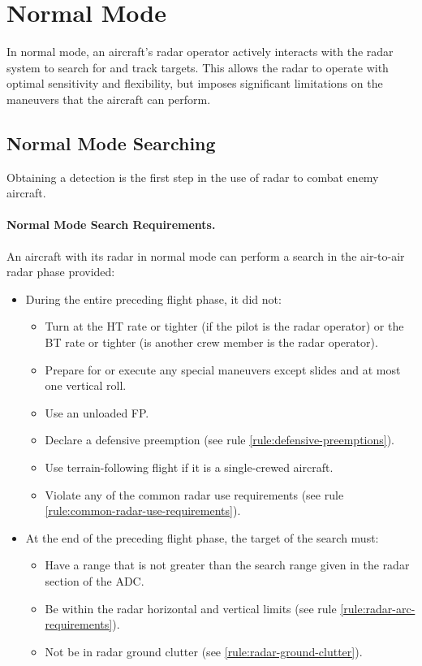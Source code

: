 {\section{Normal Mode}
\label{rule:normal-mode}

In normal mode, an aircraft's radar operator actively interacts with the radar system to search for and track targets. This allows the radar to operate with optimal sensitivity and flexibility, but imposes significant limitations on the maneuvers that the aircraft can perform.

\subsection{Normal Mode Searching}
\label{rule:normal-mode-searching}

Obtaining a detection is the first step in the use of radar to combat enemy aircraft.

\paragraph{Normal Mode Search Requirements.}
\label{rule:radar-search-requirements}

An aircraft with its radar in normal mode can perform a search in the air-to-air radar phase provided:

\begin{itemize}

\item During the entire preceding flight phase, it did not:
\begin{itemize}
        \item Turn at the HT rate or tighter (if the pilot is the radar operator) or the BT rate or tighter (is another crew member is the radar operator).
        \item Prepare for or execute any special maneuvers except slides and at most one vertical roll.
        \item Use an unloaded FP.
        \item Declare a defensive preemption (see rule \ref{rule:defensive-preemptions}).
        \item Use terrain-following flight if it is a single-crewed aircraft.
        \item Violate any of the common radar use requirements (see rule \ref{rule:common-radar-use-requirements}).
\end{itemize}

\item At the end of the preceding flight phase, the target of the search must:
\begin{itemize}
    \item Have a range that is not greater than the search range given in the radar section of the ADC. 
    \item Be within the radar horizontal and vertical limits (see rule \ref{rule:radar-arc-requirements}).
    \item Not be in radar ground clutter (see  \ref{rule:radar-ground-clutter}).
\end{itemize}


\end{itemize}}
